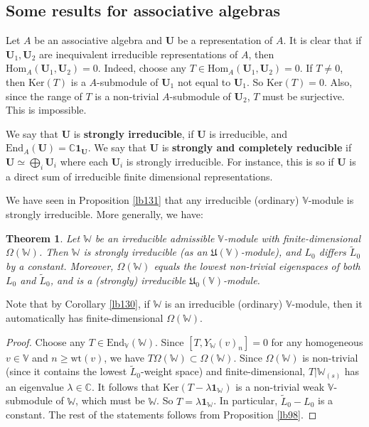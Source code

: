 \documentclass[12pt,b5paper,notitlepage]{report}
\theoremstyle{definition}
\theoremstyle{plain}
\newtheorem{thm}[df]{Theorem}
\newcommand{\fk}{\mathfrak}
\newcommand{\wtd}{\widetilde}
\newcommand{\End}{\mathrm{End}} %
\newcommand{\id}{\mathbf{1}}
\newcommand{\Hom}{\mathrm{Hom}}
\newcommand{\mbf}{\mathbf}
\newcommand{\Vbb}{\mathbb V}
\newcommand{\Wbb}{\mathbb W}
\newcommand{\Cbb}{\mathbb C}
\newcommand{\wt}{\mathrm{wt}}
\newcommand{\Ker}{\mathrm{Ker}}
\numberwithin{equation}{section}
\begin{document}
\subsection*{Some results for associative algebras}


Let $A$ be an associative algebra and $\mbf U$ be a representation of $A$. It is clear that if $\mbf U_1,\mbf U_2$ are inequivalent irreducible representations of $A$, then $\Hom_A(\mbf U_1,\mbf U_2)=0$. Indeed, choose any $T\in\Hom_A(\mbf U_1,\mbf U_2)=0$. If $T\neq 0$, then $\Ker(T)$ is a  $A$-submodule of $\mbf U_1$ not equal to $\mbf U_1$. So $\Ker(T)=0$. Also, since the range of $T$ is a non-trivial $A$-submodule of $\mbf U_2$, $T$ must be surjective. This is impossible.


We say that $\mbf U$ is \textbf{strongly irreducible}, if $\mbf U$ is irreducible, and $\End_A(\mbf U)=\Cbb\id_{\mbf U}$. We say that $\mbf U$ is \textbf{strongly and completely reducible} if $\mbf U\simeq\bigoplus_i\mbf U_i$ where each $\mbf U_i$ is strongly irreducible. For instance, this is so if $\mbf U$ is a direct sum of irreducible finite dimensional representations. 

We have seen in Proposition \ref{lb131} that any irreducible (ordinary) $\Vbb$-module is strongly irreducible. More generally, we have:

\begin{thm}\label{lb108}
Let $\Wbb$ be an irreducible admissible $\Vbb$-module with finite-dimensional $\Omega(\Wbb)$. Then $\Wbb$ is strongly irreducible (as an $\fk U(\Vbb)$-module), and $L_0$ differs $\wtd L_0$ by a constant. Moreover, $\Omega(\Wbb)$ equals the lowest non-trivial eigenspaces of both $L_0$ and $\wtd L_0$, and is a (strongly) irreducible $\fk U_0(\Vbb)$-module.
\end{thm}

Note that by Corollary \ref{lb130}, if $\Wbb$ is an irreducible (ordinary) $\Vbb$-module, then it automatically has finite-dimensional $\Omega(\Wbb)$.


\begin{proof}
Choose any $T\in\End_\Vbb(\Wbb)$. Since $[T,Y_\Wbb(v)_n]=0$ for any homogeneous $v\in\Vbb$ and $n\geq\wt(v)$, we have $T\Omega(\Wbb)\subset\Omega(\Wbb)$. Since $\Omega(\Wbb)$ is non-trivial (since it contains the lowest $\wtd L_0$-weight space) and finite-dimensional, $T|\Wbb_{(s)}$ has an eigenvalue $\lambda\in\Cbb$. It follows that $\Ker(T-\lambda\id_\Wbb)$ is a non-trivial weak $\Vbb$-submodule of $\Wbb$, which must be $\Wbb$. So $T=\lambda\id_\Wbb$. In particular, $\wtd L_0-L_0$ is a constant. The rest of the statements follows from Proposition \ref{lb98}.
\end{proof}
\end{document}
